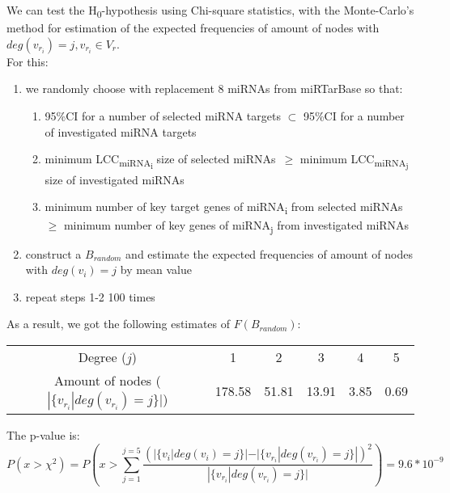 \documentclass[a4paper, 12pt]{article}
\begin{document}
We can test the H\textsubscript{0}-hypothesis using Chi-square statistics, with the Monte-Carlo's method for estimation of the expected frequencies of amount of nodes with $deg(v_{r_{i}})=j, v_{r_{i}} \in V_{r}$.
\\For this:
\begin{enumerate}
	\item we randomly choose with replacement 8 miRNAs from miRTarBase so that:
	\begin{enumerate}
		\item 95\%CI for a number of selected miRNA targets $\subset$  95\%CI for a number of investigated miRNA targets
		\item minimum LCC\textsubscript{miRNA\textsubscript{i}} size of selected miRNAs~$\geq$ minimum  LCC\textsubscript{miRNA\textsubscript{j}} size of investigated miRNAs
		\item minimum number of key target genes of miRNA\textsubscript{i} from selected miRNAs~$\geq$ minimum number of key genes of miRNA\textsubscript{j} from  investigated miRNAs
	\end{enumerate}
	\item construct a $B_{random}$ and estimate the expected frequencies of amount of nodes with $deg(v_{i})=j$ by mean value
	\item repeat steps 1-2 100 times
\end{enumerate}

As a result, we got the following estimates of $F(B_{random})$:

\begin{center}
	\begin{tabular}{ |c|c|c|c|c|c| } 
		\hline
		Degree ($j$) & 1 & 2 & 3 & 4 & 5 \\ 
		Amount of nodes ($|\{v_{r_{i}} | deg(v_{r_{i}})=j\}|$) & 178.58 & 51.81 & 13.91 & 3.85 & 0.69 \\
		\hline
	\end{tabular}
\end{center}

The p-value is:
\begin{displaymath}
	P(x>\chi^2)=P(x>\sum_{j=1}^{j=5}\frac{(|\{v_{i} | deg(v_{i})=j\}|-|\{v_{r_{i}} | deg(v_{r_{i}})=j\}|)^2}{|\{v_{r_{i}} | deg(v_{r_{i}})=j\}|})=9.6*10^{-9}
\end{displaymath}
\pagebreak
\end{document}
